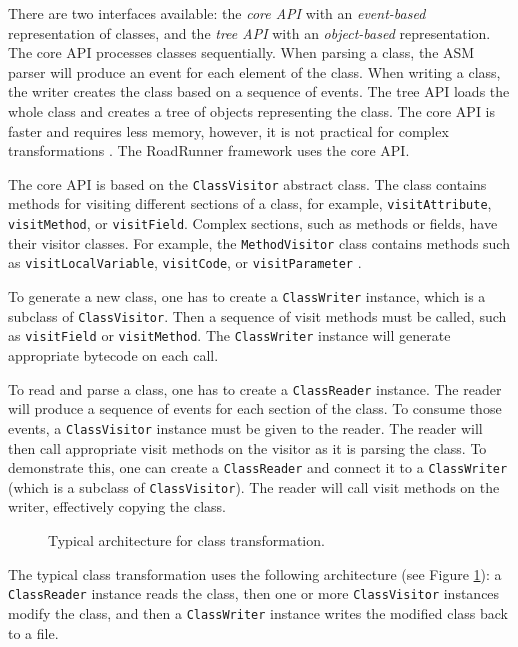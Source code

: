 There are two interfaces available: the \emph{core API} with an
\emph{event-based} representation of classes, and the \emph{tree API} with an
\emph{object-based} representation. The core API processes classes sequentially.
When parsing a class, the ASM parser will produce an event for each element of
the class.  When writing a class, the writer creates the class based on a
sequence of events. The tree API loads the whole class and creates a tree of
objects representing the class. The core API is faster and requires less memory,
however, it is not practical for complex transformations \cite{asmguide}. The
RoadRunner framework uses the core API.

The core API is based on the \texttt{ClassVisitor} abstract class. The class
contains methods for visiting different sections of a class, for example,
\texttt{visitAttribute}, \texttt{visitMethod}, or \texttt{visitField}. Complex
sections, such as methods or fields, have their visitor classes. For example,
the \texttt{MethodVisitor} class contains methods such as
\texttt{visitLocalVariable}, \texttt{visitCode}, or \texttt{visitParameter}
\cite{asmguide}.

To generate a new class, one has to create a \texttt{ClassWriter} instance,
which is a subclass of \texttt{ClassVisitor}. Then a sequence of visit methods
must be called, such as \texttt{visitField} or \texttt{visitMethod}. The
\texttt{ClassWriter} instance will generate appropriate bytecode on each call.

To read and parse a class, one has to create a \texttt{ClassReader} instance.
The reader will produce a sequence of events for each section of the class. To
consume those events, a \texttt{ClassVisitor} instance must be given to the
reader. The reader will then call appropriate visit methods on the visitor as it
is parsing the class. To demonstrate this, one can create a \texttt{ClassReader}
and connect it to a \texttt{ClassWriter} (which is a subclass of
\texttt{ClassVisitor}). The reader will call visit methods on the writer,
effectively copying the class.

\begin{figure}[hbt]
    \label{asmArchitecture}
    
    \caption{Typical architecture for class transformation.}
\end{figure}

The typical class transformation uses the following architecture (see Figure
\ref{asmArchitecture}): a \texttt{ClassReader} instance reads the class, then
one or more \texttt{ClassVisitor} instances modify the class, and then a
\texttt{ClassWriter} instance writes the modified class back to a file.

